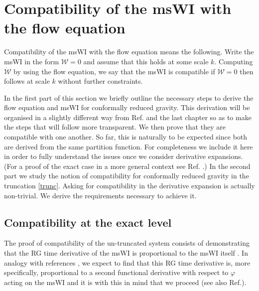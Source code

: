 \documentclass[11pt]{book}
\numberwithin{equation}{chapter}
\begin{document}
\section{Compatibility of the msWI with the flow equation}

Compatibility of the msWI with the flow equation means the following.
Write the msWI in the form $\mathcal{W}=0$ and assume that this holds at some scale $k$.
Computing $\dot{\mathcal{W}}$ by using the flow equation,
we say that the msWI is compatible if $\dot{\mathcal{W}}=0$ then follows at scale $k$ without further
constraints.

In the first part of this section we briefly outline the necessary steps to derive the flow equation
and msWI for conformally reduced gravity.
This derivation will be organised in a slightly different way from Ref. \cite{Dietz:2015owa}
and the last chapter so as to make the steps that will follow more transparent.
We then prove that they are compatible with one another.
So far, this is naturally to be expected since both are derived from the same partition function.
For completeness we include it here in order to fully understand the issues once we consider derivative
expansions. (For a proof of the exact case in a more general context see Ref. \cite{Safari:2015dva}.)
In the second part we study the notion of compatibility for conformally reduced gravity in the
truncation \eqref{trunc}. Asking for compatibility in the derivative expansion is actually non-trivial.
We derive the requirements necessary to achieve it.


\subsection{Compatibility at the exact level}\label{sec:exact}

The proof of compatibility of the un-truncated system consists of demonstrating that the
RG time derivative of the msWI is proportional to the msWI itself \cite{Litim:1998qi, Litim:1998wk}.
In analogy with references \cite{Litim:1998qi, Litim:1998wk},
we expect to find that this RG time derivative is, more specifically,
proportional to a second functional derivative with respect to $\varphi$ acting on
the msWI and it is with this in mind that we proceed (see also Ref.\cite{Safari:2015dva}).
\end{document}
